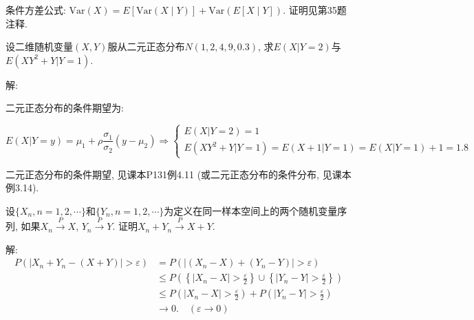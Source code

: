 \documentclass[standard]{ExBook}
\begin{document}
\begin{qitems}
\begin{bbox}
\textcolor{themeColor}{\selectfont {} 条件方差公式: $\text{Var}(X) = E[\text{Var}(X \mid Y)] + \text{Var}(E[X \mid Y])$. 证明见第35题注释.}
    \end{bbox}

\vspace{-5em}

    \begin{bbox}
    \begin{shaded}
        \qitem
设二维随机变量$(X,Y)$服从二元正态分布$N(1,2,4,9,0.3)$, 求$E(X|Y=2)$与$E(XY^2+Y|Y=1)$.
    \end{shaded}
    \end{bbox}

\vspace{-5em}

    \begin{bbox}
解: 

二元正态分布的条件期望为:
\begin{center}
\begin{equation}
\displaystyle E(X|Y=y)=\mu_1+\rho\frac{\sigma_1}{\sigma_2}(y-\mu_2) \Longrightarrow
\left\{
\begin{array}{l}
    \nonumber
E(X|Y=2)=1\\
E(XY^2+Y|Y=1)=E(X+1|Y=1)=E(X|Y=1)+1=1.8
\end{array}
\right.
\end{equation}
\end{center}
\textcolor{themeColor}{\selectfont {} 二元正态分布的条件期望, 见课本P131例4.11 (或二元正态分布的条件分布, 见课本例3.14).}
    \end{bbox}

\vspace{-5em}

    \begin{bbox}
    \begin{shaded}
        \qitem
设$\{X_n,n=1,2,\cdots\}$和$\{Y_n,n=1,2,\cdots\}$为定义在同一样本空间上的两个随机变量序列, 如果$X_n\xrightarrow{P}X$, $Y_n\xrightarrow{P}Y$. 证明$X_n+Y_n\xrightarrow{P}X+Y$.
    \end{shaded}
    \end{bbox}

\vspace{-5em}

    \begin{bbox}
解: 
\vspace{-0.5em}
\begin{align*}
P \left( \left| X_n + Y_n - (X + Y) \right| > \varepsilon \right) 
&= P \left( \left| (X_n - X) + (Y_n - Y) \right| > \varepsilon \right) \\
&\le P \left( \left\{ \left| X_n - X \right| > \frac{\varepsilon}{2} \right\} \cup \left\{ \left| Y_n - Y \right| > \frac{\varepsilon}{2} \right\} \right) \\
&\le P \left( \left| X_n - X \right| > \frac{\varepsilon}{2} \right) + P \left( \left| Y_n - Y \right| > \frac{\varepsilon}{2} \right) \\
&\to 0. \quad (\varepsilon\to0)
\end{align*}
    \end{bbox}


\end{qitems}
\end{document}
